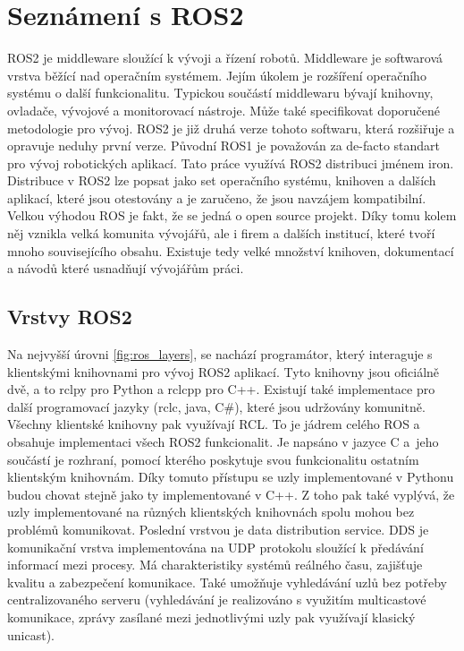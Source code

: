 \section{Seznámení s ROS2}
ROS2 je middleware sloužící k vývoji a řízení robotů. Middleware je softwarová vrstva běžící nad operačním systémem. Jejím úkolem je rozšíření operačního systému o další funkcionalitu. Typickou součástí middlewaru bývají knihovny, ovladače, vývojové a monitorovací nástroje. Může také specifikovat doporučené metodologie pro vývoj. ROS2 je již druhá verze tohoto softwaru, která rozšiřuje a opravuje neduhy první verze. Původní ROS1 je považován za de-facto standart pro vývoj robotických aplikací.
Tato práce využívá ROS2 distribuci jménem iron. Distribuce v ROS2 lze popsat jako set operačního systému, knihoven a dalších aplikací, které jsou otestovány a je zaručeno, že jsou navzájem kompatibilní. Velkou výhodou ROS je fakt, že se jedná o open source projekt. Díky tomu kolem něj vznikla velká komunita vývojářů, ale i firem a dalších institucí, které tvoří mnoho souvisejícího obsahu. Existuje tedy velké množství knihoven, dokumentací a návodů které usnadňují vývojářům práci. \cite[str:~1-5]{ros2_introduction}

\subsection*{Vrstvy ROS2}
Na nejvyšší úrovni \ref{fig:ros_layers}, se nachází programátor, který interaguje s klientskými knihovnami pro vývoj ROS2 aplikací. Tyto knihovny jsou oficiálně dvě, a to rclpy pro Python a rclcpp pro C++. Existují také implementace pro další programovací jazyky (rclc, java, C\#), které jsou udržovány komunitně. Všechny klientské knihovny pak využívají RCL. To je jádrem celého ROS a obsahuje implementaci všech ROS2 funkcionalit. Je napsáno v jazyce C a~jeho součástí je rozhraní, pomocí kterého poskytuje svou funkcionalitu ostatním klientským knihovnám. Díky tomuto přístupu se uzly implementované v Pythonu budou chovat stejně jako ty implementované v C++. Z toho pak také vyplývá, že uzly implementované na různých klientských knihovnách spolu mohou bez problémů komunikovat.
Poslední vrstvou je data distribution service. DDS je komunikační vrstva implementována na UDP protokolu sloužící k předávání informací mezi procesy. Má charakteristiky systémů reálného času, zajišťuje kvalitu a zabezpečení komunikace. Také umožňuje vyhledávání uzlů bez potřeby centralizovaného serveru (vyhledávání je realizováno s využitím multicastové komunikace, zprávy zasílané mezi jednotlivými uzly pak využívají klasický unicast). \cite[str:~13-15]{ros2_introduction}

